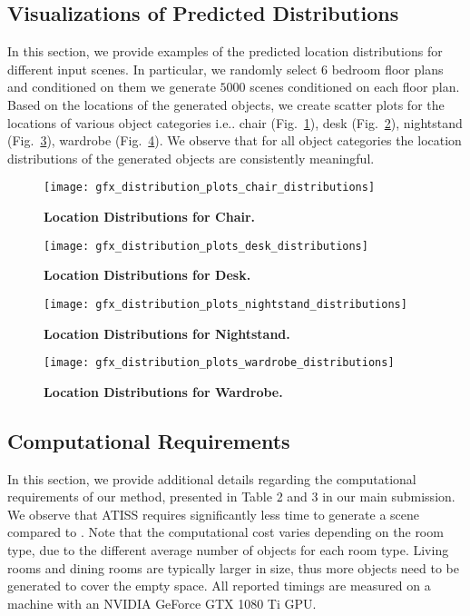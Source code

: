 \documentclass{article}
\makeatletter
\DeclareRobustCommand\onedot{\futurelet\@let@token\@onedot}
\def\@onedot{\ifx\@let@token.\else.\null\fi\xspace}
\def\ie{i.e\onedot} \def\Ie{I.e\onedot}
\newcommand{\figref}[1]{Fig.~\ref{#1}}
\makeatother
\begin{document}
\subsection{Visualizations of Predicted Distributions}

In this section, we provide examples of the predicted location distributions for
different input scenes. In particular, we randomly select $6$ bedroom floor plans and
conditioned on them we generate $5000$ scenes conditioned on each floor plan. Based on the locations of the generated objects, 
we create scatter plots for the locations of various object categories \ie chair
(\figref{fig:chair_location_distributions}), desk
(\figref{fig:desk_location_distributions}), nightstand
(\figref{fig:nightstand_location_distributions}), wardrobe
(\figref{fig:wardrobe_location_distributions}). We observe that for all object
categories the location distributions of the generated objects are consistently
meaningful.
\begin{figure}
    \centering
     \texttt{[image: gfx\_distribution\_plots\_chair\_distributions]}
     \caption{\textbf{Location Distributions for Chair.}}
     \label{fig:chair_location_distributions}
\end{figure}
\begin{figure}
    \centering
     \texttt{[image: gfx\_distribution\_plots\_desk\_distributions]}
     \caption{\textbf{Location Distributions for Desk.}}
     \label{fig:desk_location_distributions}
\end{figure}
\begin{figure}
    \centering
     \texttt{[image: gfx\_distribution\_plots\_nightstand\_distributions]}
     \caption{\textbf{Location Distributions for Nightstand.}}
     \label{fig:nightstand_location_distributions}
\end{figure}
\begin{figure}
    \centering
     \texttt{[image: gfx\_distribution\_plots\_wardrobe\_distributions]}
     \caption{\textbf{Location Distributions for Wardrobe.}}
     \label{fig:wardrobe_location_distributions}
\end{figure}

\subsection{Computational Requirements}

In this section, we provide additional details regarding the computational
requirements of our method, presented in Table 2 and 3 in our main submission.
We observe that ATISS requires significantly less time to generate a scene 
compared to \cite{Wang2020ARXIV, Ritchie2019CVPR}. Note that the computational
cost varies depending on the room type, due to the different average number of
objects for each room type. Living rooms and dining rooms are typically larger
in size, thus more objects need to be generated to cover the empty space. All
reported timings are measured on a machine with an NVIDIA GeForce GTX 1080 Ti
GPU.
\end{document}
